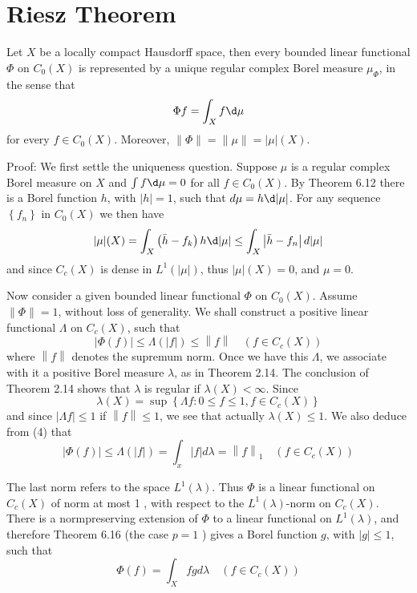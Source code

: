 \documentclass[12pt, a4paper, oneside]{book}
\begin{document}
\section{Riesz Theorem}
\begin{theorem}
    Let $X$ be a locally compact Hausdorff space, then every bounded linear functional $\Phi$ on $C_0(X)$ is represented by a unique regular complex Borel measure $\mu_\Phi$, in the sense that
    \begin{equation*}
        \Phi f
        =
        \int_X f \d  \mu
    \end{equation*}
    for every $f \in C_0(X)$. Moreover, $
        \|\Phi\|    = \|\mu\| = |\mu|(X)$.


    Proof:
    We first settle the uniqueness question. Suppose $\mu$ is a regular complex Borel measure on $X$ and $\int f \d  \mu=0$ for all $f \in C_0(X)$. By Theorem 6.12 there is a Borel function $h$, with $|h|=1$, such that $d \mu=h \d |\mu|$. For any sequence $\left\{f_n\right\}$ in $C_0(X)$ we then have
    $$
        |\mu|(X)=\int_X\left(\bar{h}-f_k\right) h \d |\mu| \leq \int_X \left|\bar{h}-f_n\right| d|\mu|
    $$
    and since $C_c(X)$ is dense in $L^1(|\mu|)$, thus $|\mu|(X)=0$, and $\mu=0$.

    Now consider a given bounded linear functional $\Phi$ on $C_0(X)$. Assume $\|\Phi\|=1$, without loss of generality. We shall construct a positive linear functional $\Lambda$ on $C_c(X)$, such that
    $$
        |\Phi(f)| \leq \Lambda(|f|) \leq\left\| f \right\| \quad\left(f \in C_c(X)\right)
    $$
    where $\left\| f \right\|$ denotes the supremum norm.
    Once we have this $\Lambda$, we associate with it a positive Borel measure $\lambda$, as in Theorem 2.14. The conclusion of Theorem 2.14 shows that $\lambda$ is regular if $\lambda(X)<\infty$. Since
    $$
        \lambda(X)=\sup \left\{\Lambda f: 0 \leq f \leq 1, f \in C_c(X)\right\}
    $$
    and since $|\Lambda f| \leq 1$ if $\left\| f \right\| \leq 1$, we see that actually $\lambda(X) \leq 1$.
    We also deduce from (4) that
    $$
        |\Phi(f)| \leq \Lambda(|f|)=\int_x|f| d \lambda=\left\| f \right\|_1 \quad\left(f \in C_c(X)\right)
    $$

    The last norm refers to the space $L^1(\lambda)$. Thus $\Phi$ is a linear functional on $C_c(X)$ of norm at most 1 , with respect to the $L^1(\lambda)$-norm on $C_c(X)$. There is a normpreserving extension of $\Phi$ to a linear functional on $L^1(\lambda)$, and therefore Theorem 6.16 (the case $p=1$ ) gives a Borel function $g$, with $|g| \leq 1$, such that
    $$
        \Phi(f)=\int_X f g d \lambda \quad\left(f \in C_c(X)\right)
    $$


\end{theorem}
\end{document}
